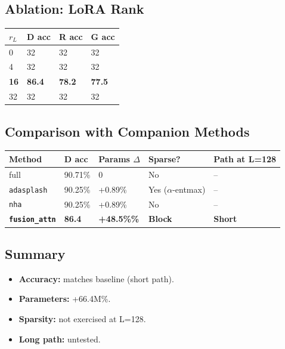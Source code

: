 \subsection{Ablation: LoRA Rank}

\begin{table}[H]
\centering
\small
\begin{tabular}{llll}
\toprule
\textbf{$r_L$} & \textbf{D acc} & \textbf{R acc} & \textbf{G acc} \\
\midrule
0 & 32 & 32 & 32 \\
4 & 32 & 32 & 32 \\
\textbf{16} & \textbf{86.4} & \textbf{78.2} & \textbf{77.5} \\
32 & 32 & 32 & 32 \\
\bottomrule
\end{tabular}
\end{table}

\subsection{Comparison with Companion Methods}

\begin{table}[H]
\centering
\small
\begin{tabular}{lllll}
\toprule
\textbf{Method} & \textbf{D acc} & \textbf{Params $\Delta$} & \textbf{Sparse?} & \textbf{Path at L=128} \\
\midrule
full & 90.71\% & 0 & No & -- \\
\texttt{adasplash} & 90.25\% & +0.89\% & Yes ($\alpha$-entmax) & -- \\
\texttt{nha} & 90.25\% & +0.89\% & No & -- \\
\textbf{\texttt{fusion\_attn}} & \textbf{86.4} & \textbf{+48.5\%\%} & \textbf{Block} & \textbf{Short} \\
\bottomrule
\end{tabular}
\end{table}

\subsection{Summary}

\begin{itemize}
\item \textbf{Accuracy:} matches baseline (short path).
\item \textbf{Parameters:} +66.4M\%.
\item \textbf{Sparsity:} not exercised at L=128.
\item \textbf{Long path:} untested.

\end{itemize}


